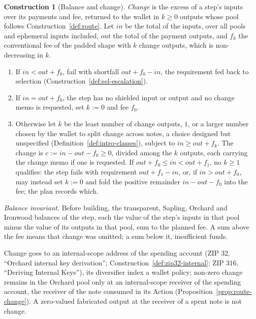 \documentclass[11pt,a4paper]{article}
\theoremstyle{definition}
\newtheorem{construction}[theorem]{Construction}
\begin{document}
\begin{construction}[Balance and change]\label{def:change}
\emph{Change} is the excess of a step's inputs over its payments and fee,
returned to the wallet in $k \ge 0$ outputs whose pool follows
Construction~\ref{def:route}. Let $\mathit{in}$ be the total of the inputs,
over all pools and ephemeral inputs included, $\mathit{out}$ the total of
the payment outputs, and $f_k$ the conventional fee of the padded shape with
$k$ change outputs, which is non-decreasing in $k$.
\begin{enumerate}[label=(\arabic*)]
\item If $\mathit{in} < \mathit{out} + f_0$, fail with shortfall
  $\mathit{out} + f_0 - \mathit{in}$, the requirement fed back to selection
  (Construction~\ref{def:sel-escalation}).
\item If $\mathit{in} = \mathit{out} + f_0$, the step has no shielded input
  or output and no change memo is requested, set $k := 0$ and fee $f_0$.
\item Otherwise let $k$ be the least number of change outputs, $1$, or a
  larger number chosen by the wallet to split change across notes, a choice
  designed but unspecified (Definition~\ref{def:intro-classes}), subject to
  $\mathit{in} \ge \mathit{out} + f_k$. The change is
  $c := \mathit{in} - \mathit{out} - f_k \ge 0$, divided among the $k$
  outputs, each carrying the change memo if one is requested. If
  $\mathit{out} + f_0 \le \mathit{in} < \mathit{out} + f_1$, no $k \ge 1$
  qualifies: the step fails with requirement
  $\mathit{out} + f_1 - \mathit{in}$, or, if $\mathit{in} > \mathit{out} +
  f_0$, may instead set $k := 0$ and fold the positive remainder
  $\mathit{in} - \mathit{out} - f_0$ into the fee; the plan records which.
\end{enumerate}
\emph{Balance invariant.} Before building, the transparent, Sapling, Orchard
and Ironwood balances of the step, each the value of the step's inputs in
that pool minus the value of its outputs in that pool, sum to the planned
fee. A sum above the fee means that change was omitted; a sum below it,
insufficient funds.

Change goes to an internal-scope address of the spending account (ZIP 32,
``Orchard internal key derivation''; Construction~\ref{def:zip32-internal};
ZIP 316, ``Deriving Internal Keys''), its diversifier index a wallet policy;
non-zero change remains in the Orchard pool only at an internal-scope
receiver of the spending account, the receiver of the note consumed in its
Action (Proposition~\ref{prop:route-change}). A zero-valued fabricated
output at the receiver of a spent note is not change.
\end{construction}
\end{document}
